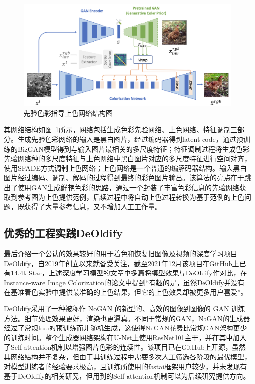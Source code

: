 \documentclass[conference]{IEEEtran}
\begin{document}
\begin{figure}[h]
    \centerline{\includegraphics[totalheight = 1.6in]{wu2021towards.png}}
    \caption{先验色彩指导上色网络结构图}
    \label{wu2021towards}
    \end{figure}
其网络结构如图~\ref{wu2021towards}所示，网络包括生成色彩先验网络、上色网络、特征调制三部分。生成先验色彩网络的输入是黑白图片，经过编码器得到latent code，通过预训练的BigGAN模型得到与输入图片最相关的多尺度特征；特征调制过程将生成色彩先验网络种的多尺度特征与上色网络中黑白图片对应的多尺度特征进行空间对齐，使用SPADE方式调制上色网络；上色网络是一个普通的编解码器结构。输入黑白图片经过编码、调制、解码的过程得到最终的彩色图片输出。该算法的亮点在于跳出了使用GAN生成鲜艳色彩的思路，通过一个封装了丰富色彩信息的先验网络获取到参考图为上色提供范例，后续过程中将自动上色过程转换为基于范例的上色问题，既获得了大量参考信息，又不增加人工工作量。
\subsection{优秀的工程实践DeOldify}
最后介绍一个公认的效果较好的用于着色和恢复旧图像及视频的深度学习项目DeOldify\cite{2019deoldify}，自2019年创立以来就备受关注，截至2021年12月该项目在GitHub上已有14.4k Star，上述深度学习模型的文章中多篇将模型效果与DeOldify作对比，在Instance-ware Image Colorization的论文中提到“有趣的是，虽然DeOldify并没有在基准着色实验中提供最准确的上色结果，但它的上色效果却被更多用户喜爱”\cite{2020Instance}。

DeOldify采用了一种被称作 NoGAN 的新型的、高效的图像到图像的 GAN 训练方法。细节处理效果更好，渲染也更逼真。不同于常规的GAN，NoGAN的生成器经过了常规loss的预训练而非随机生成，这使得NoGAN花费比常规GAN架构更少的训练时间。整个生成器网络架构在U-Net上使用ResNet101主干，并在其中加入了Self-attention机制以增强图片色彩的连续性。该项目已在GitHub上开源，虽然其网络结构并不复杂，但由于其训练过程中需要多次人工筛选各阶段的最优模型，对模型训练者的经验要求极高，且训练所使用的fastai框架用户较少，并未发现有基于DeOldify的相关研究，但用到的Self-attention机制可以为后续研究提供方向。


{}
\end{document}
